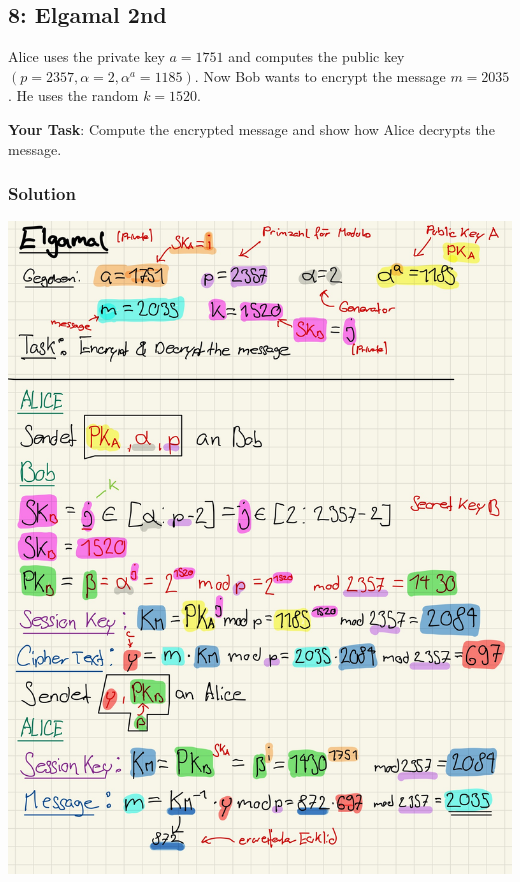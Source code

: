 \documentclass[11pt]{article}
\begin{document}
\newpage

    \hypertarget{elgamal-2nd}{%
\subsection{8: Elgamal 2nd}\label{elgamal-2nd}}

Alice uses the private key \(a=1751\) and computes the public key
\((p=2357,\alpha=2,\alpha^a =1185)\). Now Bob wants to encrypt the
message \(m = 2035\). He uses the random \(k = 1520\).

\textbf{Your Task}: Compute the encrypted message and show how Alice
decrypts the message.

\hypertarget{solution}{%
\subsubsection{Solution}\label{solution}}

\begin{center}
	\includegraphics[scale=0.85]{img/psol6_2.jpg}
\end{center}
\end{document}
